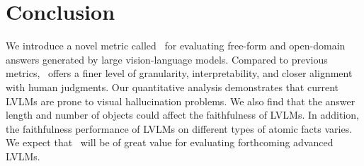 \section{Conclusion}
We introduce a novel metric called \ours\ for evaluating free-form and open-domain answers generated by large vision-language models. Compared to previous metrics, \ours\ offers a finer level of granularity, interpretability, and closer alignment with human judgments. Our quantitative analysis demonstrates that current LVLMs are prone to visual hallucination problems. We also find that the answer length and number of objects could affect the faithfulness of LVLMs. In addition, the faithfulness performance of LVLMs on different types of atomic facts varies. 
We expect that \ours\ will be of great value for evaluating forthcoming advanced LVLMs. 

